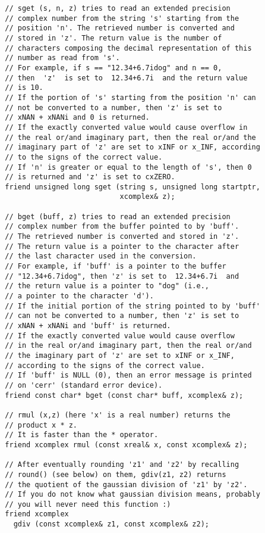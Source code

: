 \documentclass{article}
\begin{document}
\begin{verbatim}
  // sget (s, n, z) tries to read an extended precision
  // complex number from the string 's' starting from the
  // position 'n'. The retrieved number is converted and
  // stored in 'z'. The return value is the number of
  // characters composing the decimal representation of this
  // number as read from 's'. 
  // For example, if s == "12.34+6.7idog" and n == 0,
  // then  'z'  is set to  12.34+6.7i  and the return value
  // is 10.
  // If the portion of 's' starting from the position 'n' can
  // not be converted to a number, then 'z' is set to 
  // xNAN + xNANi and 0 is returned.
  // If the exactly converted value would cause overflow in
  // the real or/and imaginary part, then the real or/and the
  // imaginary part of 'z' are set to xINF or x_INF, according
  // to the signs of the correct value.
  // If 'n' is greater or equal to the length of 's', then 0
  // is returned and 'z' is set to cxZERO.
  friend unsigned long sget (string s, unsigned long startptr,
                             xcomplex& z);

  // bget (buff, z) tries to read an extended precision
  // complex number from the buffer pointed to by 'buff'. 
  // The retrieved number is converted and stored in 'z'. 
  // The return value is a pointer to the character after
  // the last character used in the conversion.
  // For example, if 'buff' is a pointer to the buffer 
  // "12.34+6.7idog", then 'z' is set to  12.34+6.7i  and 
  // the return value is a pointer to "dog" (i.e.,
  // a pointer to the character 'd').
  // If the initial portion of the string pointed to by 'buff'
  // can not be converted to a number, then 'z' is set to 
  // xNAN + xNANi and 'buff' is returned.
  // If the exactly converted value would cause overflow
  // in the real or/and imaginary part, then the real or/and
  // the imaginary part of 'z' are set to xINF or x_INF, 
  // according to the signs of the correct value.
  // If 'buff' is NULL (0), then an error message is printed
  // on 'cerr' (standard error device).
  friend const char* bget (const char* buff, xcomplex& z);

  // rmul (x,z) (here 'x' is a real number) returns the
  // product x * z.
  // It is faster than the * operator.
  friend xcomplex rmul (const xreal& x, const xcomplex& z);

  // After eventually rounding 'z1' and 'z2' by recalling
  // round() (see below) on them, gdiv(z1, z2) returns
  // the quotient of the gaussian division of 'z1' by 'z2'.
  // If you do not know what gaussian division means, probably
  // you will never need this function :)
  friend xcomplex
    gdiv (const xcomplex& z1, const xcomplex& z2);
  

\end{verbatim}
\end{document}
